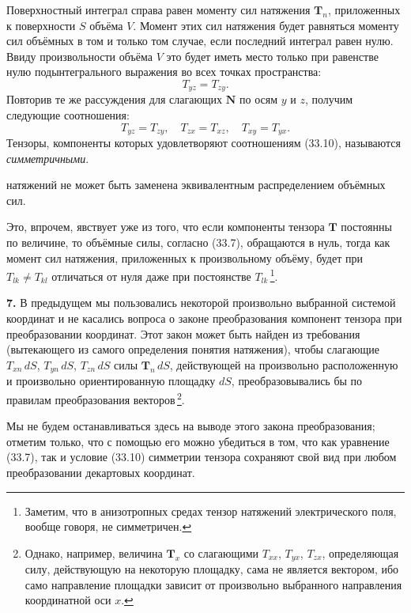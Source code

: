 \documentclass[a4paper,12pt]{article}
\begin{document}
Поверхностный интеграл справа равен моменту сил натяжения $\mathbf{T}_n$,
приложенных к поверхности $S$ объёма $V$. Момент этих сил натяжения
будет равняться моменту сил объёмных в том и только том случае, если
последний интеграл равен нулю. Ввиду произвольности объёма $V$ это
будет иметь место только при равенстве нулю подынтегрального выражения
во всех точках пространства:
$$
    T_{yz} = T_{zy}.
$$
Повторив те же рассуждения для слагающих $\mathbf{N}$ по осям $y$ и $z$,
получим следующие соотношения:
\begin{equation}
    T_{yz} = T_{zy},\quad T_{zx} = T_{xz},\quad T_{xy} = T_{yx}.
    \tag{33.10}
\end{equation}
Тензоры, компоненты которых удовлетворяют соотношениям (33.10),
называются \textit{симметричными}.


натяжений не может быть заменена эквивалентным распределением
объёмных сил.

Это, впрочем, явствует уже из того, что если компоненты тензора
$\mathbf{T}$ постоянны по величине, то объёмные силы, согласно (33.7),
обращаются в нуль, тогда как момент сил натяжения, приложенных
к произвольному объёму, будет при $T_{lk} \neq T_{kl}$ отличаться
от нуля даже при постоянстве $T_{lk}$\,\footnote{Заметим, что
в анизотропных средах тензор натяжений электрического поля, вообще
говоря, не симметричен.}.

\textbf{7.} В предыдущем мы пользовались некоторой произвольно
выбранной системой координат и не касались вопроса о законе
преобразования компонент тензора при преобразовании координат. Этот
закон может быть найден из требования (вытекающего из самого определения
понятия натяжения), чтобы слагающие $T_{xn}\,dS$, $T_{yn}\,dS$,
$T_{zn}\,dS$ силы $\mathbf{T}_n\,dS$, действующей на произвольно
расположенную и произвольно ориентированную площадку $dS$,
преобразовывались бы по правилам преобразования
векторов\,\footnote{Однако, например, величина $\mathbf{T}_x$ со
слагающими $T_{xx}$, $T_{yx}$, $T_{zx}$, определяющая силу,
действующую на некоторую площадку, сама не является вектором, ибо
само направление площадки зависит от произвольно выбранного
направления координатной оси $x$.}.

Мы не будем останавливаться здесь на выводе этого закона
преобразования; отметим только, что с помощью его можно убедиться
в том, что как уравнение (33.7), так и условие (33.10) симметрии
тензора сохраняют свой вид при любом преобразовании декартовых
координат.
\end{document}
